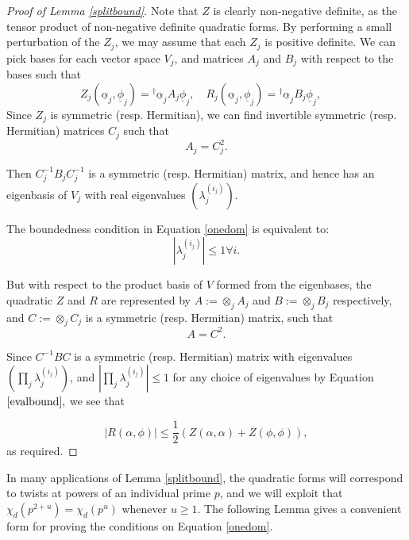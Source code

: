 \documentclass[12pt]{amsart}
\numberwithin{equation}{section}
\numberwithin{thm}{section}
\newcommand{\1}{\mathbf 1}
\begin{document}
\begin{proof}[Proof of Lemma \ref{splitbound}] 
	
	Note that $Z$ is clearly non-negative definite, as the tensor product of non-negative definite quadratic forms. By performing a small perturbation of the $Z_j$, we may assume  that each $Z_j$ is positive definite. We can pick bases   for each vector space $V_j$, and matrices $A_j$ and $B_j$ with respect to the bases such that
	\begin{equation}
		Z_j(\underline{\alpha}_j,\underline{\phi}_j)={^\dagger\underline{\alpha}_j}A_j\underline{\phi}_j, \quad R_j(\underline{\alpha}_j,\underline{\phi}_j)={^\dagger\underline{\alpha}_j}B_j\underline{\phi}_j, \quad 
	\end{equation}
	Since $Z_j$ is symmetric (resp. Hermitian), we can find invertible symmetric (resp. Hermitian)  matrices $C_j$ such that \begin{equation}	
		A_j=C_j^2.\end{equation}
	
	Then $C_j^{-1}B_j C_j^{-1}$ is a symmetric (resp. Hermitian) matrix, and hence has an eigenbasis of $V_j$ with real eigenvalues $(\lambda^{(i_j)}_j).$
	
	The boundedness condition in Equation \eqref{onedom} is equivalent to: \begin{equation}\label{evalbound}
		|\lambda^{(i_j)}_j|\le 1\forall i.\end{equation}
	
	But with respect to the product basis of $V$ formed from the eigenbases, the quadratic $Z$ and $R$ are represented by $A:=\otimes_j A_j$ and $B:=\otimes_j B_j$ respectively, and $C:=\otimes_j C_j$ is  a symmetric (resp. Hermitian) matrix, such that \begin{equation}		 				
		A=C^2.\end{equation}
	
	Since $C^{-1}BC$ is  a symmetric (resp. Hermitian) matrix with eigenvalues $\left(\prod_j \lambda_{j}^{(i_j)}\right)$, and $|\prod_j\lambda_{j}^{(i_j)}|\le 1$ for any choice of eigenvalues by Equation $\eqref{evalbound},$ we see that
	
	\begin{equation}
		\left| R(\alpha,\phi)\right|\le \frac{1}{2}\left(Z(\alpha,\alpha)+Z(\phi,\phi)\right),\end{equation}
	as required.	
\end{proof}
In many applications of Lemma \ref{splitbound}, the quadratic forms will correspond to twists at powers of an individual prime $p$, and we will exploit that $\chi_d(p^{2+u})=\chi_d(p^u)$ whenever $u\ge 1$. The following Lemma gives a convenient form for proving the conditions on Equation \eqref{onedom}. 
\end{document}
